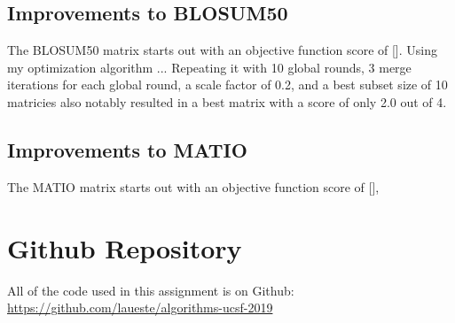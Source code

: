 \documentclass{article}
\begin{document}
\subsection{Improvements to BLOSUM50}
The BLOSUM50 matrix starts out with an objective function score of []. Using my optimization algorithm ...
Repeating it with 10 global rounds, 3 merge iterations for each global round, a scale factor of 0.2, and a best subset size of 10 matricies also notably resulted in a best matrix with a score of only 2.0 out of 4. 


\subsection{Improvements to MATIO}
The MATIO matrix starts out with an objective function score of [], 



\section{Github Repository}
All of the code used in this assignment is on Github: \url{https://github.com/laueste/algorithms-ucsf-2019}
\end{document}
